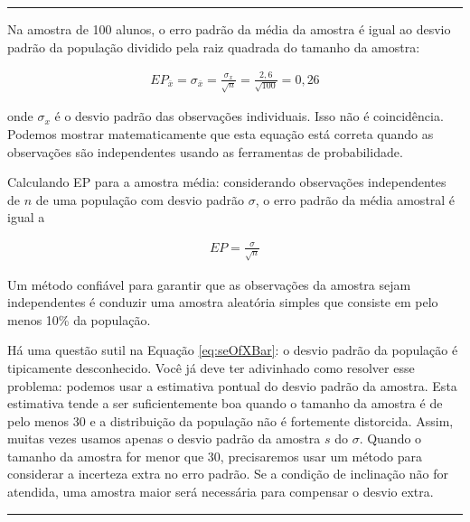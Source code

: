 \documentclass[
]{book}
\theoremstyle{definition}
\theoremstyle{definition}
\theoremstyle{definition}
\theoremstyle{definition}
\theoremstyle{remark}
\begin{document}
\begin{center}\rule{0.5\linewidth}{0.5pt}\end{center}

Na amostra de 100 alunos, o erro padrão da média da amostra é igual ao desvio padrão da população dividido pela raiz quadrada do tamanho da amostra:

\begin{eqnarray*}
EP_{\bar{x}} = \sigma_{\bar{x}} = \frac{\sigma_{x}}{\sqrt{n}} = \frac{2,6}{\sqrt{100}} = 0,26
\end{eqnarray*}

onde \(\sigma_{x}\) é o desvio padrão das observações individuais. Isso não é coincidência. Podemos mostrar matematicamente que esta equação está correta quando as observações são independentes usando as ferramentas de probabilidade.

Calculando EP para a amostra média: considerando observações independentes de \(n\) de uma população com desvio padrão \(\sigma\), o erro padrão da média amostral é igual a

\begin{eqnarray}
EP = \frac{\sigma}{\sqrt{n}}
  \label{eq:seOfXBar}
\end{eqnarray}

Um método confiável para garantir que as observações da amostra sejam independentes é conduzir uma amostra aleatória simples que consiste em pelo menos 10\% da população.

Há uma questão sutil na Equação \eqref{eq:seOfXBar}: o desvio padrão da população é tipicamente desconhecido. Você já deve ter adivinhado como resolver esse problema: podemos usar a estimativa pontual do desvio padrão da amostra. Esta estimativa tende a ser suficientemente boa quando o tamanho da amostra é de pelo menos 30 e a distribuição da população não é fortemente distorcida. Assim, muitas vezes usamos apenas o desvio padrão da amostra \(s\) do \(\sigma\). Quando o tamanho da amostra for menor que 30, precisaremos usar um método para considerar a incerteza extra no erro padrão. Se a condição de inclinação não for atendida, uma amostra maior será necessária para compensar o desvio extra.

\begin{center}\rule{0.5\linewidth}{0.5pt}\end{center}
\end{document}
